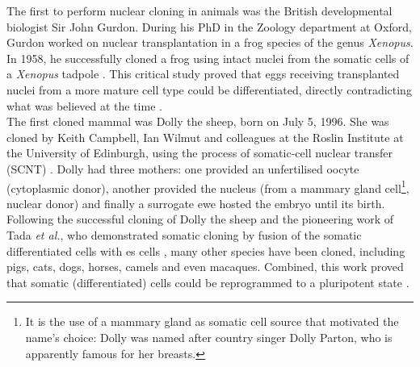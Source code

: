 The first to perform nuclear cloning in animals was the British developmental biologist Sir John Gurdon. 
During his PhD in the Zoology department at Oxford, Gurdon worked on nuclear transplantation in a frog species of the genus \textit{Xenopus}.
In 1958, he successfully cloned a frog using intact nuclei from the somatic cells of a \textit{Xenopus} tadpole \cite{gurdon1962developmental}.
This critical study proved that eggs receiving transplanted nuclei from a more mature cell type could be differentiated, directly contradicting what was believed at the time \cite{king1955changes}. \\

The first cloned mammal was Dolly the sheep, born on July 5, 1996.
She was cloned by Keith Campbell, Ian Wilmut and colleagues at the Roslin Institute at the University of Edinburgh, using the process of 
somatic-cell nuclear transfer (SCNT)
\cite{wilmut1997viable}.
Dolly had three mothers: one provided an unfertilised oocyte (cytoplasmic donor), another provided the nucleus (from a mammary gland cell\footnote{It is the use of a mammary gland as somatic cell source that motivated the name's choice: Dolly was named after country singer Dolly Parton, who is apparently famous for her breasts.}, nuclear donor) and finally a surrogate ewe hosted the embryo until its birth.\\

Following the successful cloning of Dolly the sheep and the pioneering work of Tada \textit{et al.}, who demonstrated somatic cloning by fusion of the somatic differentiated cells with \gls{es} cells \cite{tada2001nuclear}, many other species have been cloned, including pigs, cats, dogs, horses, camels and even macaques.
Combined, this work proved that somatic (differentiated) cells could be reprogrammed to a pluripotent state \cite{cowan2005nuclear}.\\



